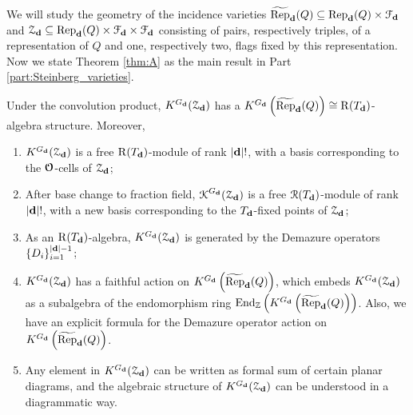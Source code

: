 We will study the geometry of the incidence varieties $\operatorname{\widetilde{\operatorname{Rep}}}_{\mathbf{d}}(Q) \subseteq \operatorname{\operatorname{Rep}}_{\mathbf{d}}(Q) \times \mathcal{F}_{\mathbf{d}}$ and $\operatorname{\mathcal{Z}}_{\mathbf{d}} \subseteq \operatorname{\operatorname{Rep}}_{\mathbf{d}}(Q) \times \mathcal{F}_{\mathbf{d}} \times \mathcal{F}_{\mathbf{d}}$ consisting of pairs, respectively triples, of a representation of $Q$ and one, respectively two, flags fixed by this representation. Now we state Theorem \ref{thm:A} as the main result in Part \ref{part:Steinberg_varieties}.

\begin{theoremA}\label{thm:A}
Under the convolution product, $K^{G_{\mathbf{d}}}(\operatorname{\mathcal{Z}}_{\mathbf{d}})$ has a $K^{G_{\mathbf{d}}}\left(\operatorname{\widetilde{\operatorname{Rep}}}_{\mathbf{d}}(Q)\right) \cong \operatorname{\operatorname{R}}(T_{\mathbf{d}})$-algebra structure. Moreover,
\begingroup
\upshape
{}
\renewcommand\labelenumi{(\theenumi)}
\begin{enumerate}
\item $K^{G_{\mathbf{d}}}(\operatorname{\mathcal{Z}}_{\mathbf{d}})$ is a free $\operatorname{\operatorname{R}}(T_{\mathbf{d}})$-module of rank $|\mathbf{d}|!$, with a basis corresponding to the $\boldsymbol{\mathcal{O}}$-cells of $\operatorname{\mathcal{Z}}_{\mathbf{d}}$;\label{item:A1}
\item After base change to fraction field, $\operatorname{\operatorname{\mathcal{K}}}^{G_{\mathbf{d}}}(\operatorname{\mathcal{Z}}_{\mathbf{d}})$ is a free $\operatorname{\operatorname{\mathcal{R}}}(T_{\mathbf{d}})$-module of rank $|\mathbf{d}|!$, with a new basis corresponding to the $T_{\mathbf{d}}$-fixed points of $\operatorname{\mathcal{Z}}_{\mathbf{d}}$;\label{item:A2}
\item As an $\operatorname{\operatorname{R}}(T_{\mathbf{d}})$-algebra, $K^{G_{\mathbf{d}}}(\operatorname{\mathcal{Z}}_{\mathbf{d}})$ is generated by the Demazure operators $\{D_i\}_{i=1}^{|\mathbf{d}|-1}$;\label{item:A3}
\item $K^{G_{\mathbf{d}}}(\operatorname{\mathcal{Z}}_{\mathbf{d}})$ has a faithful action on $K^{G_{\mathbf{d}}}\left(\operatorname{\widetilde{\operatorname{Rep}}}_{\mathbf{d}}(Q)\right)$, which embeds $K^{G_{\mathbf{d}}}(\operatorname{\mathcal{Z}}_{\mathbf{d}})$ as a subalgebra of the endomorphism ring $\operatorname{\operatorname{End}}_{\mathbb{Z}}\label{item:A4} \left(K^{G_{\mathbf{d}}}\left(\operatorname{\widetilde{\operatorname{Rep}}}_{\mathbf{d}}(Q)\right)\right)$. Also, we have an explicit formula for the Demazure operator action on $K^{G_{\mathbf{d}}}\left(\operatorname{\widetilde{\operatorname{Rep}}}_{\mathbf{d}}(Q)\right)$.
\item Any element in $K^{G_{\mathbf{d}}}(\operatorname{\mathcal{Z}}_{\mathbf{d}})$ can be written as formal sum of certain planar diagrams, and the algebraic structure of $K^{G_{\mathbf{d}}}(\operatorname{\mathcal{Z}}_{\mathbf{d}})$ can be understood in a diagrammatic way.\label{item:A5}
\end{enumerate} 
\endgroup
\end{theoremA}

